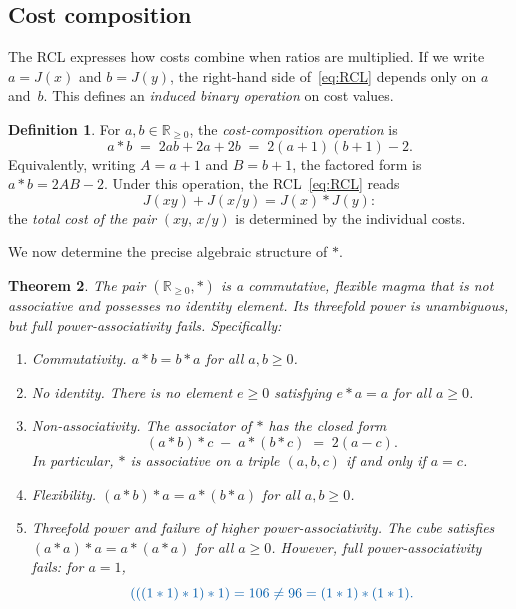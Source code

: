 \documentclass[11pt,reqno]{amsart}
\theoremstyle{plain}
\newtheorem{theorem}{Theorem}[section]
\theoremstyle{definition}
\newtheorem{definition}[theorem]{Definition}
\theoremstyle{remark}
\newcommand{\Jcost}{J}
\newcommand{\RR}{\mathbb{R}}
\newcommand{\1}{\mathbf{1}}
\newcommand{\paperadd}[1]{{\color{paperblue}#1}}
\begin{document}
\subsection{Cost composition}\label{ssec:star} The RCL expresses how costs combine when ratios are multiplied.
If we write $a=\Jcost(x)$ and $b=\Jcost(y)$, the right-hand side
of~\eqref{eq:RCL} depends only on $a$ and~$b$. This defines an
\emph{induced binary operation} on cost values. \begin{definition}\label{def:ast}
For $a,b\in\RR_{\ge0}$, the \emph{cost-composition operation} is
\begin{equation}\label{eq:ast} a\ast b \;=\; 2ab+2a+2b \;=\; 2(a{+}1)(b{+}1)-2.
\end{equation}
Equivalently, writing $A=a+1$ and $B=b+1$, the factored form is
$a\ast b = 2AB - 2$. Under this operation, the
RCL~\eqref{eq:RCL} reads
\begin{equation}\label{eq:RCL-star} \Jcost(xy)+\Jcost(x/y) = \Jcost(x)\ast\Jcost(y):
\end{equation}
the \emph{total cost of the pair} $(xy,\,x/y)$ is determined by the
individual costs.
\end{definition} We now determine the precise algebraic structure of $\ast$. \begin{theorem}\label{thm:ast-structure}
The pair $(\RR_{\ge0},\ast)$ is a commutative, flexible magma that is not associative and
possesses no identity element. \paperadd{Its threefold power is unambiguous, but full power-associativity fails.} Specifically:
\begin{enumerate}[nosep,label=\textup{(\alph*)}]
\item Commutativity. $a\ast b = b\ast a$ for all $a,b\ge0$.
\item No identity. There is no element $e\ge0$ satisfying $e\ast a=a$ for all $a\ge0$.
\item Non-associativity. The \emph{associator} of $\ast$ has the closed form \begin{equation}\label{eq:associator} (a\ast b)\ast c \;-\; a\ast(b\ast c) \;=\; 2(a-c). \end{equation} In particular, $\ast$ is associative on a triple $(a,b,c)$ if and only if $a=c$.
\item Flexibility. $(a\ast b)\ast a = a\ast(b\ast a)$ for all $a,b\ge0$.
\item \paperadd{Threefold power and failure of higher power-associativity. The cube satisfies \((a\ast a)\ast a = a\ast(a\ast a)\) for all \(a\ge0\). However, full power-associativity fails: for \(a=1\),}
\[
\paperadd{(((1\ast 1)\ast 1)\ast 1)=106\neq 96=(1\ast 1)\ast(1\ast 1).}
\]
\end{enumerate}
\end{theorem}
\end{document}
